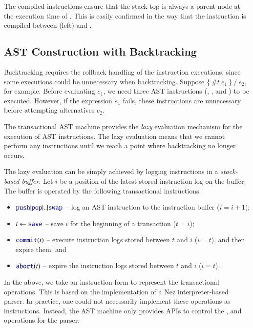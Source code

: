 \documentclass[JIP]{ipsj}
\begin{document}
The compiled instructions ensure that the stack top is always a parent node at the execution time of . This is easily confirmed in the way that the  instruction is compiled between (\textrm{left}) and .

\subsection{AST Construction with Backtracking} \label{sec:sync}

Backtracking requires the rollback handling of the instruction executions, since some executions could be unnecessary when backtracking. Suppose $\{ ~ \#t ~ e_1 ~ \} ~/ ~e_2$, for example. Before evaluating $e_1$, we need three AST instructions (, , and ) to be executed. However, if the expression $e_1$ fails, these instructions are unnecessary before attempting alternatives $e_2$.

The transactional AST machine provides the {\em lazy} evaluation mechanism for the execution of AST instructions. The lazy evaluation means that we cannot perform any instructions until we reach a point where backtracking no longer occurs.  

The lazy evaluation can be simply achieved by logging instructions in a {\em stack-based buffer}. Let $i$ be a position of the latest stored instruction log on the buffer. The buffer is operated by the following transactional instructions:

\begin{itemize}
\item {} $\kw{push}|\kw{pop}|..|\kw{swap}$ -- log an AST instruction to the instruction buffer ($i = i + 1$);
\item $t \leftarrow \kw{save}$ -- save $i$ for the beginning of a transaction ($t = i$);
\item $\kw{commit}(t)$ -- execute instruction logs stored between $t$ and $i$ ($i = t$), and then expire them; and 
\item $\kw{abort}(t)$ -- expire the instruction logs stored between $t$ and $i$ ($i = t$).
\end{itemize}

In the above, we take an instruction form to represent the transactional operations. This is based on the implementation of a Nez interpreter-based parser. In practice, one could not necessarily implement these operations as instructions. Instead, the AST machine only provides APIs to control the ,  and  operations for the parser. 
\end{document}

